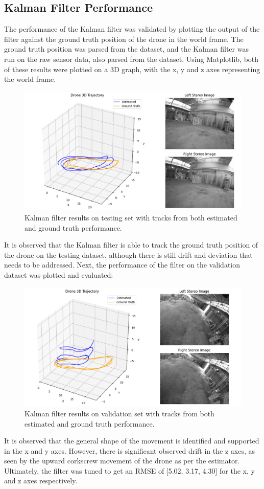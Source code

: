 \documentclass[bare_jrnl_transmag]{subfiles}
\begin{document}
\subsection{Kalman Filter Performance}
The performance of the Kalman filter was validated by plotting the output of the filter against the ground truth position of the drone in the world frame. The ground truth position was parsed from the dataset, and the Kalman filter was run on the raw sensor data, also parsed from the dataset. Using Matplotlib, both of these results were plotted on a 3D graph, with the x, y and z axes representing the world frame.

\begin{figure}[H]
    \centering
    \includegraphics[width=0.8\linewidth]{figures/kf_results.png}
    \caption{Kalman filter results on testing set with tracks from both estimated and ground truth performance.}
    \label{fig:kalman_results_test_set}
\end{figure}

It is observed that the Kalman filter is able to track the ground truth position of the drone on the testing dataset, although there is still drift and deviation that needs to be addressed. Next, the performance of the filter on the validation dataset was plotted and evaluated:

\begin{figure}[H]
    \centering
    \includegraphics[width=0.8\linewidth]{figures/kf_validation_results.png}
    \caption{Kalman filter results on validation set with tracks from both estimated and ground truth performance.}
    \label{fig:kalman_results_test_set}
\end{figure}

It is observed that the general shape of the movement is identified and supported in the x and y axes. However, there is significant observed drift in the z axes, as seen by the upward corkscrew movement of the drone as per the estimator. Ultimately, the filter was tuned to get an RMSE of [5.02, 3.17, 4.30] for the x, y and z axes respectively.
\end{document}
